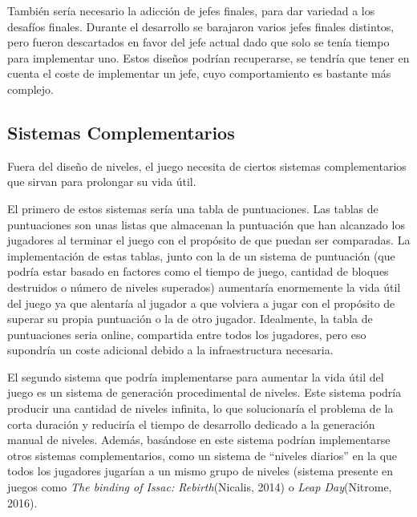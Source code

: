 También sería necesario la adicción de jefes finales, para dar variedad a los desafíos finales. Durante el desarrollo se barajaron varios jefes finales distintos, pero fueron descartados en favor del jefe actual dado que solo se tenía tiempo para implementar uno. Estos diseños podrían recuperarse, se tendría que tener en cuenta el coste de implementar un jefe, cuyo comportamiento es bastante más complejo.

\subsection{Sistemas Complementarios}
Fuera del diseño de niveles, el juego necesita de ciertos sistemas complementarios que sirvan para prolongar su vida útil.

El primero de estos sistemas sería una tabla de puntuaciones. Las tablas de puntuaciones son unas listas que almacenan la puntuación que han alcanzado los jugadores al terminar el juego con el propósito de que puedan ser comparadas. La implementación de estas tablas, junto con la de un sistema de puntuación (que podría estar basado en factores como el tiempo de juego, cantidad de bloques destruidos o número de niveles superados) aumentaría enormemente la vida útil del juego ya que alentaría al jugador a que volviera a jugar con el propósito de superar su propia puntuación o la de otro jugador. Idealmente, la tabla de puntuaciones seria online, compartida entre todos los jugadores, pero eso supondría un coste adicional debido a la infraestructura necesaria.

El segundo sistema que podría implementarse para aumentar la vida útil del juego es un sistema de generación procedimental de niveles. Este sistema podría producir una cantidad de niveles infinita, lo que solucionaría el problema de la corta duración y reduciría el tiempo de desarrollo dedicado a la generación manual de niveles. Además, basándose en este sistema podrían implementarse otros sistemas complementarios, como un sistema de ``niveles diarios'' en la que todos los jugadores jugarían a un mismo grupo de niveles (sistema presente en juegos como \textit{The binding of Issac: Rebirth}(Nicalis, 2014) o \textit{Leap Day}(Nitrome, 2016).
